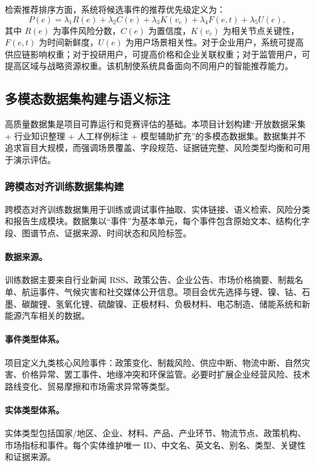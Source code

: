 \documentclass[12pt,a4paper]{article}
\begin{document}
检索推荐排序方面，系统将候选事件的推荐优先级定义为：
\begin{equation}
P(e)=\lambda_1 R(e)+\lambda_2 C(e)+\lambda_3 K(v_e)+\lambda_4 F(e,t)+\lambda_5 U(e),
\end{equation}
其中 $R(e)$ 为事件风险分数，$C(e)$ 为置信度，$K(v_e)$ 为相关节点关键性，$F(e,t)$ 为时间新鲜度，$U(e)$ 为用户场景相关性。对于企业用户，系统可提高供应链影响权重；对于投研用户，可提高价格和企业关联权重；对于监管用户，可提高区域与战略资源权重。该机制使系统具备面向不同用户的智能推荐能力。

\subsection{多模态数据集构建与语义标注}

高质量数据集是项目可靠运行和竞赛评估的基础。本项目计划构建“开放数据采集 + 行业知识整理 + 人工样例标注 + 模型辅助扩充”的多模态数据集。数据集并不追求盲目大规模，而强调场景覆盖、字段规范、证据链完整、风险类型均衡和可用于演示评估。

\subsubsection{跨模态对齐训练数据集构建}

跨模态对齐训练数据集用于训练或调试事件抽取、实体链接、语义检索、风险分类和报告生成模块。数据集以“事件”为基本单元，每个事件包含原始文本、结构化字段、图谱节点、证据来源、时间状态和风险标签。

\paragraph{数据来源。}训练数据主要来自行业新闻 RSS、政策公告、企业公告、市场价格摘要、制裁名单、航运事件、气候灾害和社交媒体公开信息。项目会优先选择与锂、镍、钴、石墨、碳酸锂、氢氧化锂、硫酸镍、正极材料、负极材料、电芯制造、储能系统和新能源汽车相关的数据。

\paragraph{事件类型体系。}项目定义九类核心风险事件：政策变化、制裁风险、供应中断、物流中断、自然灾害、价格异常、罢工事件、地缘冲突和环保监管。必要时扩展企业经营风险、技术路线变化、贸易摩擦和市场需求异常等类型。

\paragraph{实体类型体系。}实体类型包括国家/地区、企业、材料、产品、产业环节、物流节点、政策机构、市场指标和事件。每个实体维护唯一 ID、中文名、英文名、别名、类型、关键性和证据来源。
\end{document}
